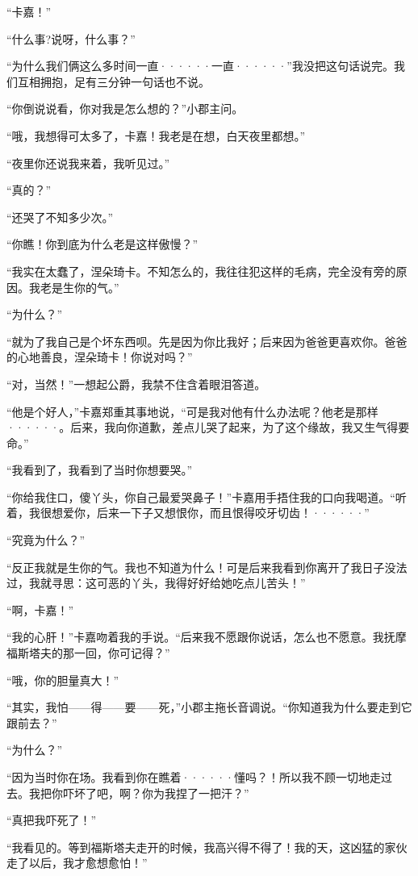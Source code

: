 \documentclass[12pt, UTF8]{ctexbook}
\begin{document}
\par “卡嘉！”
\par “什么事?说呀，什么事？”
\par “为什么我们俩这么多时间一直······一直······”我没把这句话说完。我们互相拥抱，足有三分钟一句话也不说。
\par “你倒说说看，你对我是怎么想的？”小郡主问。
\par “哦，我想得可太多了，卡嘉！我老是在想，白天夜里都想。”
\par “夜里你还说我来着，我听见过。”
\par “真的？”
\par “还哭了不知多少次。”
\par “你瞧！你到底为什么老是这样傲慢？”
\par “我实在太蠢了，涅朵琦卡。不知怎么的，我往往犯这样的毛病，完全没有旁的原因。我老是生你的气。”
\par “为什么？”
\par “就为了我自己是个坏东西呗。先是因为你比我好；后来因为爸爸更喜欢你。爸爸的心地善良，涅朵琦卡！你说对吗？”
\par “对，当然！”一想起公爵，我禁不住含着眼泪答道。
\par “他是个好人，”卡嘉郑重其事地说，“可是我对他有什么办法呢？他老是那样······。后来，我向你道歉，差点儿哭了起来，为了这个缘故，我又生气得要命。”
\par “我看到了，我看到了当时你想要哭。”
\par “你给我住口，傻丫头，你自己最爱哭鼻子！”卡嘉用手捂住我的口向我喝道。“听着，我很想爱你，后来一下子又想恨你，而且恨得咬牙切齿！······”
\par “究竟为什么？”
\par “反正我就是生你的气。我也不知道为什么！可是后来我看到你离开了我日子没法过，我就寻思：这可恶的丫头，我得好好给她吃点儿苦头！”
\par “啊，卡嘉！”
\par “我的心肝！”卡嘉吻着我的手说。“后来我不愿跟你说话，怎么也不愿意。我抚摩福斯塔夫的那一回，你可记得？”
\par “哦，你的胆量真大！”
\par “其实，我怕——得——要——死，”小郡主拖长音调说。“你知道我为什么要走到它跟前去？”
\par “为什么？”
\par “因为当时你在场。我看到你在瞧着······懂吗？！所以我不顾一切地走过去。我把你吓坏了吧，啊？你为我捏了一把汗？”
\par “真把我吓死了！”
\par “我看见的。等到福斯塔夫走开的时候，我高兴得不得了！我的天，这凶猛的家伙走了以后，我才愈想愈怕！”
\end{document}
